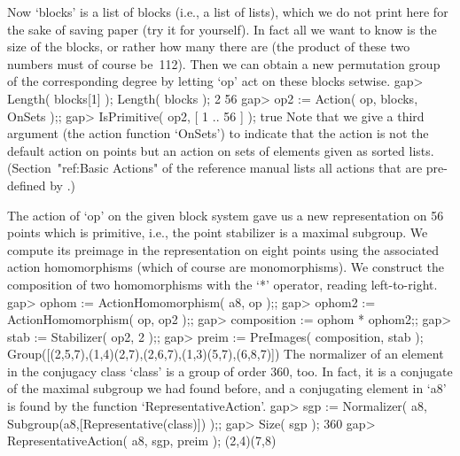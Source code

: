 Now `blocks' is a list of blocks (i.e., a list of lists), which we do not
print  here for the  sake of saving paper (try  it for yourself). In fact
all we want to know is the size of  the blocks, or  rather how many there
are (the product of these two numbers must of course be~112). Then we can
obtain a new  permutation group  of the  corresponding  degree by letting
`op' act on these blocks setwise.
\beginexample
gap> Length( blocks[1] );  Length( blocks );
2
56
gap> op2 := Action( op, blocks, OnSets );;
gap> IsPrimitive( op2, [ 1 .. 56 ] );
true
\endexample
Note that we give a third argument (the action function `OnSets') to
indicate that the action is not the default action on points but an
action on sets of elements given as sorted lists.
(Section~"ref:Basic Actions" of the reference manual lists all
actions that are pre-defined by {\GAP}.)

The action of `op' on the given block system gave us a new representation
on 56 points which is primitive, i.e., the  point stabilizer is a maximal
subgroup. We  compute its preimage in the  representation on eight points
using the   associated   action homomorphisms (which   of   course are
monomorphisms). We construct  the  composition of two  homomorphisms with
the `*' operator, reading left-to-right.
\beginexample
gap> ophom := ActionHomomorphism( a8, op );;
gap> ophom2 := ActionHomomorphism( op, op2 );;
gap> composition := ophom * ophom2;;
gap> stab := Stabilizer( op2, 2 );;
gap> preim := PreImages( composition, stab );
Group([(2,5,7),(1,4)(2,7),(2,6,7),(1,3)(5,7),(6,8,7)])
\endexample
The normalizer of an element in the conjugacy class `class' is a group of
order 360, too. In fact, it is a conjugate of the maximal subgroup we had
found before, and a conjugating element in `a8'  is found by the function
`RepresentativeAction'.
\beginexample
gap> sgp := Normalizer( a8, Subgroup(a8,[Representative(class)]) );;
gap> Size( sgp );
360
gap> RepresentativeAction( a8, sgp, preim );
(2,4)(7,8)
\endexample

